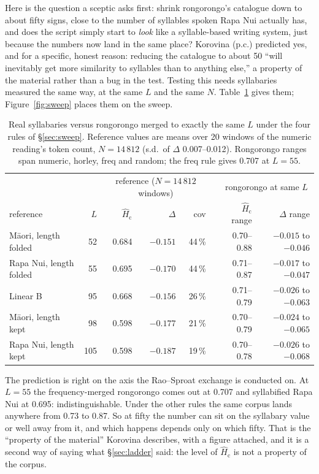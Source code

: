 \documentclass[11pt,a4paper]{article}
\newcommand{\Hcn}{\hat H_{\mathrm{c}}}
\begin{document}
Here is the question a sceptic asks first: shrink rongorongo's catalogue down to about fifty signs, close to the number of syllables spoken Rapa Nui actually has, and does the script simply start to \emph{look} like a syllable-based writing system, just because the numbers now land in the same place? Korovina (p.c.) predicted yes, and for a specific, honest reason: reducing the catalogue to about 50 ``will inevitably get more similarity to syllables than to anything else,'' a property of the material rather than a bug in the test. Testing this needs syllabaries measured the same way, at the same $L$ and the same $N$. Table~\ref{tab:syll} gives them; Figure~\ref{fig:sweep} places them on the sweep.

\begin{table}[t]
\centering\small
\begin{tabular}{l r rrr l rr}
\toprule
 & & \multicolumn{3}{c}{reference ($N=14\,812$ windows)} & & \multicolumn{2}{c}{rongorongo at same $L$} \\
reference & $L$ & $\Hcn$ & $\Delta$ & cov & & $\Hcn$ range & $\Delta$ range \\
\midrule
M\=aori, length folded   &  52 & 0.684 & $-0.151$ & 44\,\% & & 0.70--0.88 & $-0.015$ to $-0.046$ \\
Rapa Nui, length folded  &  55 & 0.695 & $-0.170$ & 44\,\% & & 0.71--0.87 & $-0.017$ to $-0.047$ \\
Linear B                 &  95 & 0.668 & $-0.156$ & 26\,\% & & 0.71--0.79 & $-0.026$ to $-0.063$ \\
M\=aori, length kept     &  98 & 0.598 & $-0.177$ & 21\,\% & & 0.70--0.79 & $-0.024$ to $-0.065$ \\
Rapa Nui, length kept    & 105 & 0.598 & $-0.187$ & 19\,\% & & 0.70--0.78 & $-0.026$ to $-0.068$ \\
\bottomrule
\end{tabular}
\caption{Real syllabaries versus rongorongo merged to exactly the same $L$ under the four rules of \S\ref{sec:sweep}. Reference values are means over 20 windows of the numeric reading's token count, $N=14\,812$ (s.d.\ of $\Delta$ 0.007--0.012). Rongorongo ranges span numeric, horley, freq and random; the freq rule gives 0.707 at $L=55$.}
\label{tab:syll}
\end{table}

The prediction is right on the axis the Rao--Sproat exchange is conducted on. At $L=55$ the frequency-merged rongorongo comes out at 0.707 and syllabified Rapa Nui at 0.695: indistinguishable. Under the other rules the same corpus lands anywhere from 0.73 to 0.87. So at fifty the number can sit on the syllabary value or well away from it, and which happens depends only on which fifty. That is the ``property of the material'' Korovina describes, with a figure attached, and it is a second way of saying what \S\ref{sec:ladder} said: the level of $\Hcn$ is not a property of the corpus.
\end{document}
